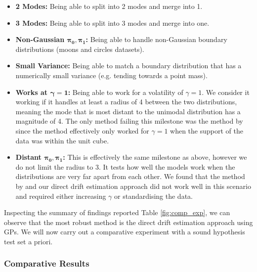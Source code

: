 \documentclass[a4paper,12pt,twoside,openright]{report}
\theoremstyle{definition}
\begin{document}
\begin{itemize}
    \item \textbf{ 2 Modes:} Being able to split into 2 modes and merge into 1.
    \item \textbf{ 3 Modes:} Being able to split into 3 modes and merge into one.
    \item \textbf{Non-Gaussian $\bm{\pi_0,\pi_1}$:} Being able to handle non-Gaussian boundary distributions (moons and circles datasets). 
    \item \textbf{Small Variance:} Being able to match a boundary distribution that has a numerically small variance (e.g. tending towards a point mass).  
    \item \textbf{Works at $\bm{\gamma=1}$:} Being able to work for a volatility of $\gamma=1$. We consider it working if it handles at least  a radius of 4 between the two distributions, meaning the mode that is most distant to the unimodal distribution has a magnitude of 4. The only method failing this milestone was the method by \cite{pavon2018data} since the method effectively only worked for $\gamma=1$ when the support of the data was within the unit cube.
    \item \textbf{Distant $\bm{\pi_0, \pi_1}$:} This is effectively the same milestone as above, however we do not limit the radius to 3. It tests how well the models work when the distributions are very far apart from each other. We found that the method by \cite{pavon2018data} and our direct drift estimation approach did not work well in this scenario and required either increasing $\gamma$ or standardising the data.
\end{itemize}

Inspecting the summary of findings reported Table \ref{fig:comp_exp}, we can observe that the most robust method is the direct drift estimation approach using GPs. We will now carry out a comparative experiment with a sound hypothesis test set a priori. 

\subsubsection{Comparative Results}
\end{document}
